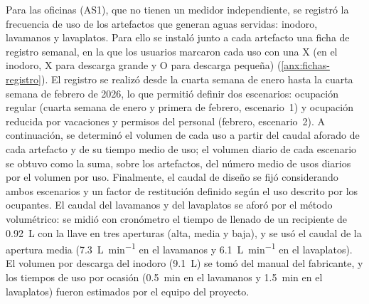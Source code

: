 Para las oficinas (AS1), que no tienen un medidor independiente, se registró la frecuencia de uso de los artefactos que generan aguas servidas: inodoro, lavamanos y lavaplatos.
Para ello se instaló junto a cada artefacto una ficha de registro semanal, en la que los usuarios marcaron cada uso con una X (en el inodoro, X para descarga grande y O para descarga pequeña) (\cref{anx:fichas-registro}).
El registro se realizó desde la cuarta semana de enero hasta la cuarta semana de febrero de 2026, lo que permitió definir dos escenarios: ocupación regular (cuarta semana de enero y primera de febrero, escenario~1) y ocupación reducida por vacaciones y permisos del personal (febrero, escenario~2).
A continuación, se determinó el volumen de cada uso a partir del caudal aforado de cada artefacto y de su tiempo medio de uso; el volumen diario de cada escenario se obtuvo como la suma, sobre los artefactos, del número medio de usos diarios por el volumen por uso.
Finalmente, el caudal de diseño se fijó considerando ambos escenarios y un factor de restitución definido según el uso descrito por los ocupantes.
El caudal del lavamanos y del lavaplatos se aforó por el método volumétrico: se midió con cronómetro el tiempo de llenado de un recipiente de \qty{0.92}{\liter} con la llave en tres aperturas (alta, media y baja), y se usó el caudal de la apertura media (\qty{7.3}{\liter\per\minute} en el lavamanos y \qty{6.1}{\liter\per\minute} en el lavaplatos).
El volumen por descarga del inodoro (\qty{9.1}{\liter}) se tomó del manual del fabricante, y los tiempos de uso por ocasión (\qty{0.5}{\minute} en el lavamanos y \qty{1.5}{\minute} en el lavaplatos) fueron estimados por el equipo del proyecto.

